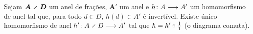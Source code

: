 \begin{proposition}
\label{prop:anel.frac.prop.univer}
Sejam $\bm{A \olddiv D}$ um anel de frações, $\bm A'$ um anel e ${h}\colon {A} \longrightarrow {A'}$ um homomorfismo de anel tal que, para todo $d \in D$, $h(d) \in A'$ é invertível. Existe único homomorfismo de anel $\fun{h'}{A \olddiv D}{A'}$ tal que $h = h' \circ \frac{\mathrm{I}}{1}$ (o diagrama comuta).
\begin{figure}
\centering
{}
\end{figure}
\end{proposition}
